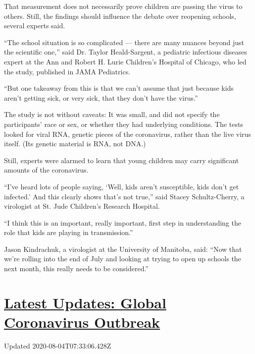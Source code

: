That measurement does not necessarily prove children are passing the
virus to others. Still, the findings should influence the debate over
reopening schools, several experts said.

``The school situation is so complicated --- there are many nuances
beyond just the scientific one,'' said Dr. Taylor Heald-Sargent, a
pediatric infectious diseases expert at the Ann and Robert H. Lurie
Children's Hospital of Chicago, who led the study, published in JAMA
Pediatrics.

``But one takeaway from this is that we can't assume that just because
kids aren't getting sick, or very sick, that they don't have the
virus.''

The study is not without caveats: It was small, and did not specify the
participants' race or sex, or whether they had underlying conditions.
The tests looked for viral RNA, genetic pieces of the coronavirus,
rather than the live virus itself. (Its genetic material is RNA, not
DNA.)

Still, experts were alarmed to learn that young children may carry
significant amounts of the coronavirus.

``I've heard lots of people saying, `Well, kids aren't susceptible, kids
don't get infected.' And this clearly shows that's not true,'' said
Stacey Schultz-Cherry, a virologist at St. Jude Children's Research
Hospital.

``I think this is an important, really important, first step in
understanding the role that kids are playing in transmission.''

Jason Kindrachuk, a virologist at the University of Manitoba, said:
``Now that we're rolling into the end of July and looking at trying to
open up schools the next month, this really needs to be considered.''

\hypertarget{latest-updates-global-coronavirus-outbreak}{%
\section{\texorpdfstring{\href{https://www.nytimes.com/2020/08/03/world/coronavirus-covid-19.html?action=click\&pgtype=Article\&state=default\&region=MAIN_CONTENT_1\&context=storylines_live_updates}{Latest
Updates: Global Coronavirus
Outbreak}}{Latest Updates: Global Coronavirus Outbreak}}\label{latest-updates-global-coronavirus-outbreak}}

Updated 2020-08-04T07:33:06.428Z

